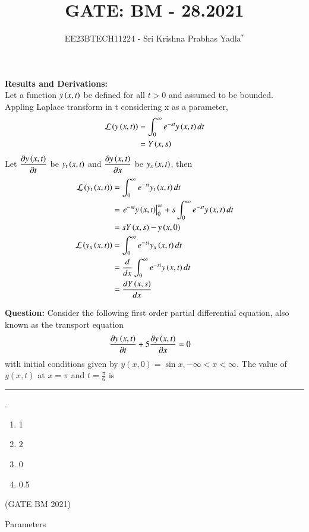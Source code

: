 \documentclass[journal,12pt,twocolumn]{IEEEtran}
\theoremstyle{remark}
\begin{document}

\vspace{3cm}

\title{GATE: BM - 28.2021}
\author{EE23BTECH11224 - Sri Krishna Prabhas Yadla$^{*}$%
}
\maketitle
\newpage
\bigskip

\renewcommand{\thefigure}{\arabic{figure}}
\renewcommand{\thetable}{\arabic{table}}


\vspace{3cm}
\textbf{Results and Derivations:}
\\
Let a function $y\left(x,t\right)$ be defined for all $t>0$ and assumed to be bounded. Appling Laplace transform in t considering x as a parameter,
\begin{align}
 \mathcal{L}\left(y\left(x,t\right)\right) &= \int_{0}^{\infty}e^{-st}y\left(x,t\right)dt\\
 &= Y\left(x,s\right)
\end{align}
Let $\dfrac{\partial y\left(x,t\right)}{\partial t}$ be $y_t\left(x,t\right)$ and $\dfrac{\partial y\left(x,t\right)}{\partial x}$ be $y_x\left(x,t\right)$, then
\begin{align}
 \mathcal{L}\left(y_t\left(x,t\right)\right) &= \int_{0}^{\infty}e^{-st}y_t\left(x,t\right)dt\\
 &= \left. e^{-st}y\left(x,t\right)\right|_{0}^{\infty} + s\int_{0}^{\infty}e^{-st} y\left(x,t\right) dt\\
 &= sY\left(x,s\right) - y\left(x,0\right) \label{L(y_t(x,t))}\\
 \mathcal{L}\left(y_x\left(x,t\right)\right) &= \int_{0}^{\infty}e^{-st}y_x\left(x,t\right)dt\\
 &= \dfrac{d}{dx}\int_{0}^{\infty}e^{-st}y\left(x,t\right)dt \label{L(y_x(x,t))}\\
 &= \dfrac{dY\left(x,s\right)}{dx}
\end{align}

\textbf{Question:} Consider the following first order partial differential equation, also known as the transport equation
\begin{align*}
\frac{\partial y\left(x,t\right)}{\partial t}+5\frac{\partial y\left(x,t\right)}{\partial x}&=0
\end{align*}
with initial conditions given by $y(x, 0) = \sin x,-\infty < x < \infty$. The value of $y(x, t)$ at $x = \pi$ and $t=\frac{\pi}{6}$ is  \rule{1cm}{0.15mm}.
\begin{enumerate}[label=(\Alph*)]
\item 1
\item 2
\item 0
\item 0.5
\end{enumerate}
\hfill(GATE BM 2021)
\\
\solution
\begin{table}[htbp]
	\centering
	\def\arraystretch{1.5}
	
	\caption{Parameters}
	\label{tab:parameters_bm_28_21}
\end{table}
\end{document}
